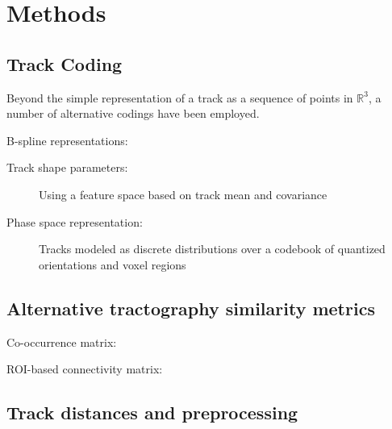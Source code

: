 \documentclass[preprint,authoryear,a4paper,10pt,onecolumn]{elsarticle}
\begin{document}
\section{Methods}

\subsection{\label{sub:track-coding}Track Coding}

Beyond the simple representation of a track as a sequence of points in
$\mathbb{R}^3$, a number of alternative codings have been employed.

\begin{description}

\item[B-spline representations:] \citep{Maddah_MICCA2005,
    maddah2006statistical, Maddah_IEEEBI2008}

\item[Track shape parameters:] Using a feature space based on track mean
  and covariance \citep{brun2004clustering}

\item[Phase space representation:] Tracks modeled as discrete
distributions over a codebook of quantized orientations and voxel regions \citep{wang2010tractography}

\end{description}

\subsection{Alternative tractography similarity metrics}

Co-occurrence matrix: \citep{jonasson2005fiber}

ROI-based connectivity matrix: \citep{ElKouby2005}

\subsection{\label{sub:track-distances}Track distances and preprocessing}
\end{document}
